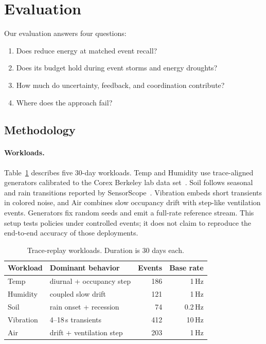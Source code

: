 \section{Evaluation}
\label{sec:evaluation}

Our evaluation answers four questions:

\begin{enumerate}[leftmargin=*,itemsep=1pt,topsep=3pt]
  \item Does \system reduce energy at matched event recall?
  \item Does its budget hold during event storms and energy droughts?
  \item How much do uncertainty, feedback, and coordination contribute?
  \item Where does the approach fail?
\end{enumerate}

\subsection{Methodology}

\paragraph{Workloads.}
Table~\ref{tab:workloads} describes five 30-day workloads.  Temp and Humidity
use trace-aligned generators calibrated to the Corex Berkeley lab data
set~\cite{madden2004tinydb}.  Soil follows seasonal and rain transitions
reported by SensorScope~\cite{barrenetxea2008sensorscope}.  Vibration embeds
short transients in colored noise, and Air combines slow occupancy drift with
step-like ventilation events.  Generators fix random seeds and emit a full-rate
reference stream.  This setup tests policies under controlled events; it does
not claim to reproduce the end-to-end accuracy of those deployments.

\begin{table}[t]
  \caption{Trace-replay workloads.  Duration is 30 days each.}
  \label{tab:workloads}
  \centering
  \small
  \begin{tabular}{@{}llrr@{}}
    \toprule
    Workload & Dominant behavior & Events & Base rate \\
    \midrule
    Temp & diurnal + occupancy step & 186 & 1\,Hz \\
    Humidity & coupled slow drift & 121 & 1\,Hz \\
    Soil & rain onset + recession & 74 & 0.2\,Hz \\
    Vibration & 4--18\,s transients & 412 & 10\,Hz \\
    Air & drift + ventilation step & 203 & 1\,Hz \\
    \bottomrule
  \end{tabular}
\end{table}


